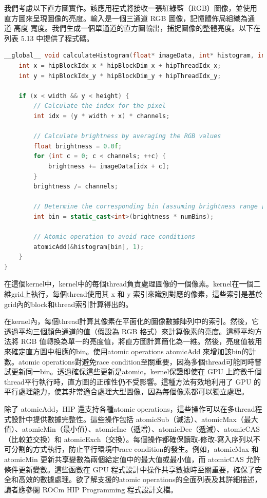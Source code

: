 \vspace{1em}
我們考慮以下直方圖實作。該應用程式將接收一張紅綠藍（RGB）圖像，並使用直方圖來呈現圖像的亮度。輸入是一個三通道 RGB 圖像，記憶體佈局組織為通道-高度-寬度。我們生成一個單通道的直方圖輸出，捕捉圖像的整體亮度。以下在列表 5.13 中提供了程式碼。
\lstset{style=mystyle}
\begin{lstlisting}[language=c++,caption={使用atomic operations實作的直方圖 GPU kernel}]
__global__ void calculateHistogram(float* imageData, int* histogram, int width, int height, int channels, int numBins) {
    int x = hipBlockIdx_x * hipBlockDim_x + hipThreadIdx_x;
    int y = hipBlockIdx_y * hipBlockDim_y + hipThreadIdx_y;

    if (x < width && y < height) {
        // Calculate the index for the pixel
        int idx = (y * width + x) * channels;

        // Calculate brightness by averaging the RGB values
        float brightness = 0.0f;
        for (int c = 0; c < channels; ++c) {
            brightness += imageData[idx + c];
        }
        brightness /= channels;

        // Determine the corresponding bin (assuming brightness range [0,1])
        int bin = static_cast<int>(brightness * numBins);

        // Atomic operation to avoid race conditions
        atomicAdd(&histogram[bin], 1);
    }
}
\end{lstlisting}

\vspace{1em}
在這個kernel中，kernel中的每個thread負責處理圖像的一個像素。kernel在一個二維grid上執行，每個thread使用其 x 和 y 索引來識別對應的像素，這些索引是基於grid內的block和thread索引計算得出的。

\vspace{1em}
在kernel內，每個thread計算其像素在平面化的圖像數據陣列中的索引。然後，它透過平均三個顏色通道的值（假設為 RGB 格式）來計算像素的亮度。這種平均方法將 RGB 值轉換為單一的亮度值，將直方圖計算簡化為一維。然後，亮度值被用來確定直方圖中相應的bin。使用atomic operations atomicAdd 來增加該bin的計數。atomic operations對避免race condition至關重要，因為多個thread可能同時嘗試更新同一bin。透過確保這些更新是atomic，kernel保證即使在 GPU 上跨數千個thread平行執行時，直方圖的正確性仍不受影響。這種方法有效地利用了 GPU 的平行處理能力，使其非常適合處理大型圖像，因為每個像素都可以獨立處理。

\vspace{1em}
除了 atomicAdd，HIP 還支持各種atomic operations，這些操作可以在多thread程式設計中提供數據完整性。這些操作包括 atomicSub（減法）、atomicMax（最大值）、atomicMin（最小值）、atomicInc（遞增）、atomicDec（遞減）、atomicCAS（比較並交換）和 atomicExch（交換）。每個操作都確保讀取-修改-寫入序列以不可分割的方式執行，防止平行環境中race condition的發生。例如，atomicMax 和 atomicMin 更新共享變數為兩個給定值中的最大值或最小值，而 atomicCAS 允許條件更新變數。這些函數在 GPU 程式設計中操作共享數據時至關重要，確保了安全和高效的數據處理。欲了解支援的atomic operations的全面列表及其詳細描述，讀者應參閱 ROCm HIP Programming 程式設計文檔。

